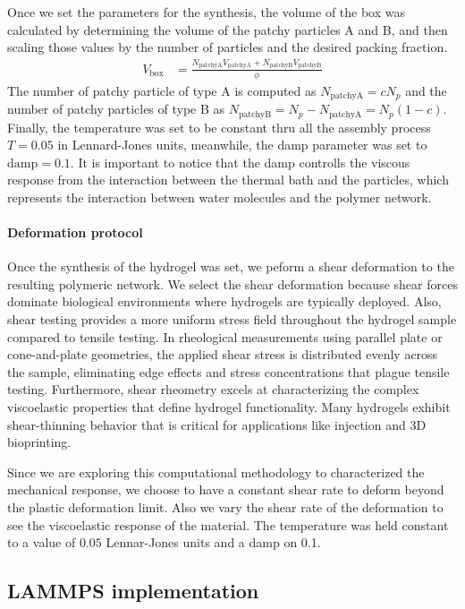 Once we set the parameters for the synthesis, the volume of the box was calculated by determining the volume of the patchy particles A and B, and then scaling those values by the number of particles and the desired packing fraction.
\begin{align*}
    V_{\mathrm{box}} &= \frac{N_{\mathrm{patchyA}}V_{\mathrm{patchyA}}+N_{\mathrm{patchyB}}V_{\mathrm{patchyB}}}{\phi}
\end{align*}
The number of patchy particle of type A is computed as $N_{\mathrm{patchyA}} = c N_p$ and the number of patchy particles of type B as $N_{\mathrm{patchyB}}= N_p - N_{\mathrm{patchyA}}= N_p(1 - c )$.
Finally, the temperature was set to be constant thru all the assembly process $T=0.05$ in Lennard-Jones units, meanwhile, the damp parameter was set to $\mathrm{damp}=0.1$.
It is important to notice that the damp controlls the viscous response from the interaction between the thermal bath and the particles, which represents the interaction between water molecules and the polymer network.

\paragraph{Deformation protocol} 
Once the synthesis of the hydrogel was set, we peform a shear deformation to the resulting polymeric network.
We select the shear deformation because shear forces dominate biological environments where hydrogels are typically deployed. 
Also, shear testing provides a more uniform stress field throughout the hydrogel sample compared to tensile testing. 
In rheological measurements using parallel plate or cone-and-plate geometries, the applied shear stress is distributed evenly across the sample, eliminating edge effects and stress concentrations that plague tensile testing.
Furthermore, shear rheometry excels at characterizing the complex viscoelastic properties that define hydrogel functionality.
Many hydrogels exhibit shear-thinning behavior that is critical for applications like injection and 3D bioprinting. 

Since we are exploring this computational methodology to characterized the mechanical response, we choose to have a constant shear rate to deform beyond the plastic deformation limit.
Also we vary the shear rate of the deformation to see the viscoelastic response of the material.
The temperature was held constant to a value of $0.05$ Lennar-Jones units and a damp on \num{0.1}.


\subsection{LAMMPS implementation}

